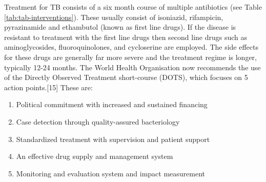 \documentclass[11pt,twoside]{bristolthesis}
\providecommand{\tightlist}{%
  \setlength{\itemsep}{0pt}\setlength{\parskip}{0pt}}
\begin{document}
  Treatment for TB consists of a six month course of multiple antibiotics (see Table \ref{tab:tab-interventions}). These usually consist of isoniazid, rifampicin, pyrazinamide and ethambutol (known as first line drugs). If the disease is resistant to treatment with the first line drugs then second line drugs such as aminoglycosides, fluoroquinolones, and cycloserine are employed. The side effects for these drugs are generally far more severe and the treatment regime is longer, typically 12-24 months. The World Health Organisation now recommends the use of the Directly Observed Treatment short-course (DOTS), which focuses on 5 action points.{[}15{]} These are:
  \begin{enumerate}
  \def\labelenumi{\arabic{enumi}.}
  \tightlist
  \item
    Political commitment with increased and sustained financing
  \item
    Case detection through quality-assured bacteriology
  \item
    Standardized treatment with supervision and patient support
  \item
    An effective drug supply and management system
  \item
    Monitoring and evaluation system and impact measurement
  \end{enumerate}
\end{document}
